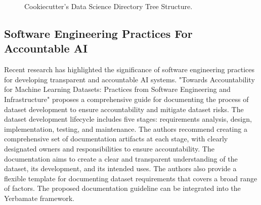 \begin{figure}
    \centering
    \caption{Cookiecutter's Data Science Directory Tree Structure.}
    \label{fig:directory-tree}
\end{figure}



\subsection{Software Engineering Practices For Accountable AI}

Recent research has highlighted the significance of software engineering practices for developing transparent and accountable AI systems. "Towards Accountability for Machine Learning Datasets: Practices from Software Engineering and Infrastructure" proposes a comprehensive guide for documenting the process of dataset development to ensure accountability and mitigate dataset risks. The dataset development lifecycle includes five stages: requirements analysis, design, implementation, testing, and maintenance. The authors recommend creating a comprehensive set of documentation artifacts at each stage, with clearly designated owners and responsibilities to ensure accountability. The documentation aims to create a clear and transparent understanding of the dataset, its development, and its intended uses. The authors also provide a flexible template for documenting dataset requirements that covers a broad range of factors. The proposed documentation guideline can be integrated into the Yerbamate framework.

